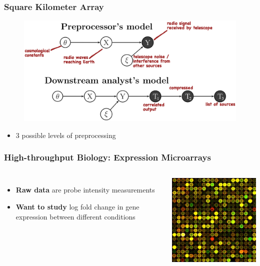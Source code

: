 \documentclass[10pt, compress]{beamer}
\begin{document}
\begin{frame}[fragile]
    \frametitle{Square Kilometer Array}
    \begin{figure}[h!]
    \centering
    \includegraphics[width=\textwidth]{assets/radio_observation_model.eps}
    \end{figure}   
    \begin{itemize}
        \item 3 possible levels of preprocessing
    \end{itemize}
\end{frame}
\begin{frame}[fragile]
    \frametitle{High-throughput Biology: Expression Microarrays}
    
    \begin{columns}
            \begin{itemize}
                \item \textbf{Raw data} are probe intensity measurements
                \item \textbf{Want to study} log fold change in gene expression between different conditions
            \end{itemize}
        \vspace{.01cm}
            \includegraphics[height=\textheight]{assets/microarray.jpg}
    \end{columns}
    
\end{frame}
\end{document}
